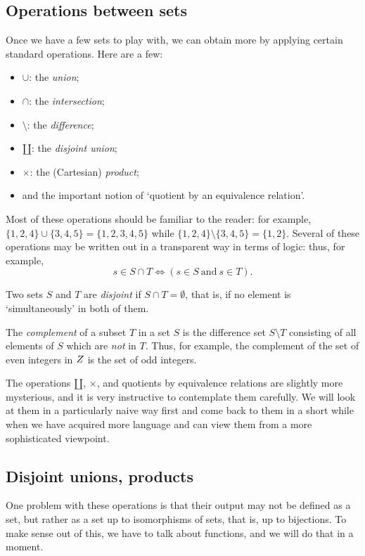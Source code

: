 \subsection{Operations between sets}%
\label{subsec:prelims:operations-between-sets}
Once we have a few sets to play with, we can obtain more by applying
certain standard operations. Here are a few:
\begin{itemize}
\item $\cup$: the \emph{union};
\item $\cap$: the \emph{intersection};
\item $\setminus$: the \emph{difference};
\item $\amalg$: the \emph{disjoint union};
\item $\times$: the (Cartesian) \emph{product};
\item and the important notion of `quotient by an equivalence
  relation'.
\end{itemize}
Most of these operations should be familiar to the reader: for
example, $\{1, 2, 4\} \cup \{3, 4, 5\} = \{1, 2, 3, 4, 5\}$ while
$\{1, 2, 4\} \setminus \{3, 4, 5\} = \{1, 2\}$.
Several of these operations may be written out in a transparent way in
terms of logic: thus, for example,
\[
  s \in S \cap T \iff (s \in S\ \mathrm{and\ } s \in T ).
\]

Two sets $S$ and $T$ are \emph{disjoint} if
$S \cap T = \emptyset$, that is, if no element is `simultaneously' in
both of them.

The \emph{complement} of a subset $T$ in a set $S$
is the difference set $S \setminus T$ consisting of all elements of
$S$ which are \emph{not} in $T$. Thus, for example, the complement of
the set of even integers in $Z$ is the set of odd integers.

The operations $\amalg$, $\times$, and quotients by equivalence
relations are slightly more mysterious, and it is very instructive to
contemplate them carefully. We will look at them in a particularly
naive way first and come back to them in a short while when we have
acquired more language and can view them from a more sophisticated
viewpoint.

\subsection{Disjoint unions, products}%
\label{subsec:prelims:disjoint-unions-products}
One problem with these operations is that their output may not be
defined as a set, but rather as a set up to isomorphisms of sets, that
is, up to bijections.  To make sense out of this, we have to talk
about functions, and we will do that in a moment.

